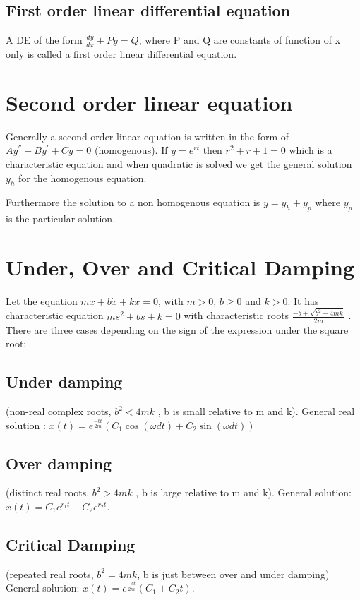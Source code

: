  \subsection*{First order linear differential equation} 
 \par A DE of the form $\frac{dy}{dx}+Py=Q$, where P and Q are constants of function of x only is called a first order linear  differential equation.      
\section*{Second order linear equation}
\par Generally a second order linear equation is written in the form of $Ay^{''}+By^{'}+Cy=0$ (homogenous). If $y=e^{rt}$ then $r^{2}+r+1=0$ which is a characteristic equation and when quadratic is solved we get the general solution $y_{h}$ for the homogenous equation.
\par Furthermore the solution to a non homogenous equation is $y=y_{h}+y_{p}$ where $y_{p}$ is the particular solution.
\section*{Under, Over and Critical Damping}
\par Let the equation $m\ddot{x} + b\dot{x} + kx = 0$,  with $m > 0$, $b \geq 0$ and $k > 0$. It has characteristic equation $ms^{2} + bs + k = 0$ with characteristic roots $\frac{-b\pm \sqrt{b^{2} - 4mk}}{2m} $ .\\ 
There are three cases depending on the sign of the expression under the square root:
 
 \subsection*{Under damping} (non-real complex roots, $b^{2} < 4mk$ , b is small relative to m and k).
 General real solution : $x(t)= e^{\frac{-bt}{2m}}(C_{1} \cos(\omega dt)+ C_{2} \sin(\omega dt))$
 
 \subsection*{Over damping} (distinct real roots, $b^{2} > 4mk$ , b is large relative to m and k).
 General solution:$ x(t) = C_{1}e^{r_{1}t} + C_{2}e^{r_{2}t}$.
 \subsection*{Critical Damping} (repeated real roots, $b^{2} = 4mk$, b is just between over and under damping)
 General solution: $x(t) = e^{\frac{-bt}{2m}}(C_{1} + C_{2}t)$.
 

